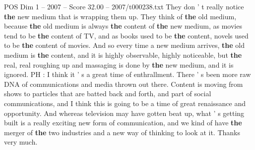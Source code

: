 \begin{textsample}{POS Dim 1 – 2007 – Score 32.00 – 2007/t000238.txt}
They don ' t really notice \textbf{the} new medium that is wrapping them up.
They think of \textbf{the} old medium, because \textbf{the} old medium is always \textbf{the} content of \textbf{the} new medium, as movies tend to be \textbf{the} content of TV, and as books used to be \textbf{the} content, novels used to be \textbf{the} content of movies.
And so every time a new medium arrives, \textbf{the} old medium is \textbf{the} content, and it is highly observable, highly noticeable, but \textbf{the} real, real roughing up and massaging is done by \textbf{the} new medium, and it is ignored.
PH : I think it ' s a great time of enthrallment.
There ' s been more raw DNA of communications and media thrown out there.
Content is moving from shows to particles that are batted back and forth, and part of social communications, and I think this is going to be a time of great renaissance and opportunity.
And whereas television may have gotten beat up, what ' s getting built is a really exciting new form of communication, and we kind of have \textbf{the} merger of \textbf{the} two industries and a new way of thinking to look at it.
Thanks very much.

\end{textsample}
